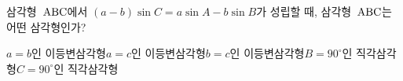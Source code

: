 삼각형~$\mathrm{ABC}$에서 $(a-b)\sin C=a\sin A-b\sin B$가 성립할 때, 삼각형~$\mathrm{ABC}$는 어떤 삼각형인가?
\begin{choicesv}{$a=b$인 이등변삼각형}{$a=c$인 이등변삼각형}{$b=c$인 이등변삼각형}{$B=90^\circ$인 직각삼각형}{$C=90^\circ$인 직각삼각형}\end{choicesv}
